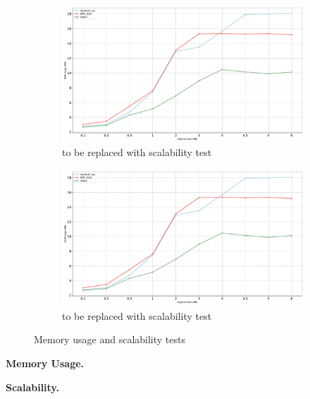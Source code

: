 \begin{figure}[ht]
\begin{subfigure}{0.49\textwidth}   
  \centering
  \includegraphics[width=\textwidth]{content/figures/lineplot_segsize_combined.pdf}
  \caption{to be replaced with scalability test}
  \label{snr_e}
\end{subfigure}\hfill
\begin{subfigure}{0.49\textwidth}   
  \centering
  \includegraphics[width=\textwidth]{content/figures/lineplot_segsize_combined.pdf}
  \caption{to be replaced with scalability test}
  \label{snr_f}
\end{subfigure}
\caption{Memory usage and scalability tests}
\label{os}

\end{figure}
\textbf{Memory Usage.}

\textbf{Scalability.}